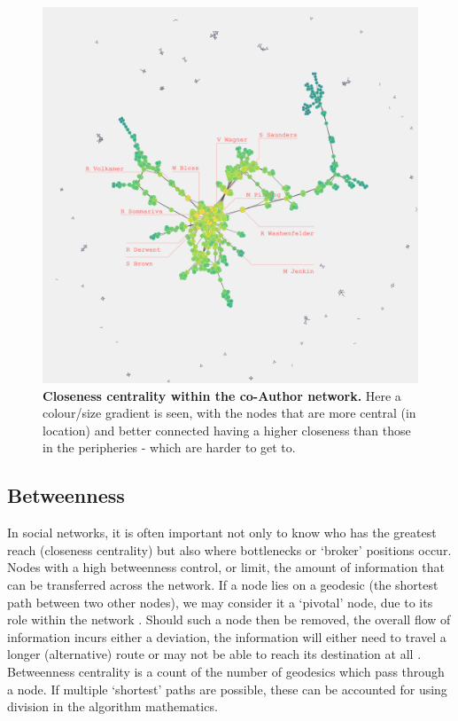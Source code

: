 \begin{figure}[H]
     \centering
         \includegraphics[width=.8\textwidth]{figures_c3/closenessauthor.png}

         
        \caption{ \textbf{Closeness centrality within the co-Author network.} Here a colour/size gradient is seen, with the nodes that are more central (in location) and better connected having a higher closeness than those in the peripheries - which are harder to get to.}
        \label{fig:closeauth}
\end{figure}
%
\subsection{Betweenness}\label{sec:betweenness}
In social networks, it is often important not only to know who has the greatest reach (closeness centrality) but also where bottlenecks or `broker' positions occur. Nodes with a high betweenness control, or limit, the amount of information that can be transferred across the network. If a node lies on a geodesic (the shortest path between two other nodes), we may consider it a `pivotal' node, due to its role within the network \citep{neoj4}. Should such a node then be removed, the overall flow of information incurs either a deviation, the information will either need to travel a longer (alternative) route or may not be able to reach its destination at all \citep{betweenness, between, betweenfast,examples_centrality}.
Betweenness centrality is a count of the number of geodesics which pass through a node. If multiple `shortest' paths are possible, these can be accounted for using division in the algorithm mathematics.


